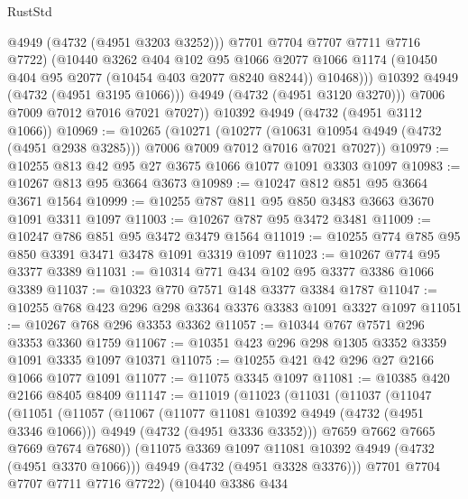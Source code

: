 \begin{lexlean}{RustStd}
\begin{coremodule}
                    @4949
                    (@4732 (@4951 @3203 @3252)))
                  @7701
                  @7704
                  @7707
                  @7711
                  @7716
                  @7722)
                (@10440
                  @3262
                  @404
                  @102
                  @95
                  @1066
                  @2077
                  @1066
                  @1174
                  (@10450 @404 @95 @2077 (@10454 @403 @2077 @8240 @8244))
                  @10468)))
            @10392
            @4949
            (@4732 (@4951 @3195 @1066)))
          @4949
          (@4732 (@4951 @3120 @3270)))
        @7006
        @7009
        @7012
        @7016
        @7021
        @7027))
    @10392
    @4949
    (@4732 (@4951 @3112 @1066))
@10969 := @10265
    (@10271
      (@10277
        (@10631 @10954 @4949 (@4732 (@4951 @2938 @3285)))
        @7006
        @7009
        @7012
        @7016
        @7021
        @7027))
@10979 := @10255 @813 @42 @95 @27 @3675 @1066 @1077 @1091 @3303 @1097
@10983 := @10267 @813 @95 @3664 @3673
@10989 := @10247 @812 @851 @95 @3664 @3671 @1564
@10999 := @10255 @787 @811 @95 @850 @3483 @3663 @3670 @1091 @3311 @1097
@11003 := @10267 @787 @95 @3472 @3481
@11009 := @10247 @786 @851 @95 @3472 @3479 @1564
@11019 := @10255 @774 @785 @95 @850 @3391 @3471 @3478 @1091 @3319 @1097
@11023 := @10267 @774 @95 @3377 @3389
@11031 := @10314 @771 @434 @102 @95 @3377 @3386 @1066 @3389
@11037 := @10323 @770 @7571 @148 @3377 @3384 @1787
@11047 := @10255 @768 @423 @296 @298 @3364 @3376 @3383 @1091 @3327 @1097
@11051 := @10267 @768 @296 @3353 @3362
@11057 := @10344 @767 @7571 @296 @3353 @3360 @1759
@11067 := @10351 @423 @296 @298 @1305 @3352 @3359 @1091 @3335 @1097 @10371
@11075 := @10255 @421 @42 @296 @27 @2166 @1066 @1077 @1091
@11077 := @11075 @3345 @1097
@11081 := @10385 @420 @2166 @8405 @8409
@11147 := @11019
    (@11023
      (@11031
        (@11037
          (@11047
            (@11051
              (@11057
                (@11067
                  (@11077 @11081 @10392 @4949 (@4732 (@4951 @3346 @1066)))
                  @4949
                  (@4732 (@4951 @3336 @3352)))
                @7659
                @7662
                @7665
                @7669
                @7674
                @7680))
            (@11075 @3369 @1097 @11081 @10392 @4949 (@4732 (@4951 @3370 @1066)))
            @4949
            (@4732 (@4951 @3328 @3376)))
          @7701
          @7704
          @7707
          @7711
          @7716
          @7722)
        (@10440
          @3386
          @434

\end{coremodule}
\end{lexlean}
